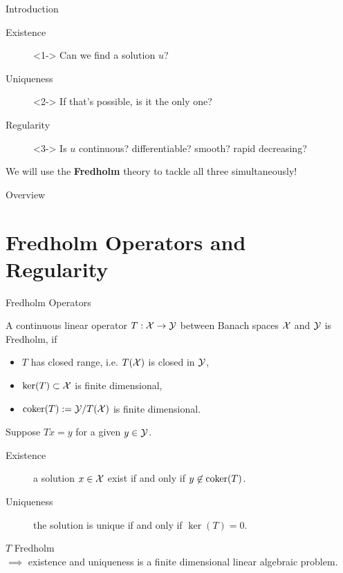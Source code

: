 \documentclass{beamer}
\begin{document}
\begin{frame}{Introduction}
\begin{description}
    \item[Existence]<1-> Can we find a solution $u$? 
    \item[Uniqueness ]<2->  If that's possible,  is it the only one? 
    \item[Regularity ]<3-> Is $u$ continuous? differentiable? smooth? rapid decreasing? \\
\end{description}

 We will use the \textbf{Fredholm} theory  to tackle all three simultaneously! 

\end{frame} 



\begin{frame}{Overview}
\tableofcontents
\end{frame}

\section{Fredholm Operators and Regularity} 


\begin{frame}{Fredholm Operators}
\begin{definition}
    A continuous linear operator $T : \mathcal{X} \to\mathcal{Y}$ between Banach spaces $\mathcal{X}$ and $\mathcal{Y}$ is Fredholm, if 
    \begin{itemize}
        \item $T$ has closed range, i.e. $T(\mathcal{X})$ is closed in $\mathcal{Y}$, 
        \item ${\mathrm{ker}}(T) \subset \mathcal{X} $ is finite dimensional, 
        \item ${\mathrm{coker}}(T) := \mathcal{Y} / T(\mathcal{X})$ is finite dimensional. 
    \end{itemize}
\end{definition}
\pause
Suppose $Tx = y$ for a given $y \in \mathcal{Y}$. 
\begin{description}
    \item[Existence] a solution $x \in \mathcal{X}$ exist if and only if  $y \not \in {\mathrm{coker}}(T)$. 
    \item[Uniqueness] the solution is unique if and only if $\ker(T) = 0$. 
\end{description}
\pause
$T$ Fredholm \\
$\implies$ existence and uniqueness is a finite dimensional linear algebraic problem. 

\end{frame}
\end{document}
